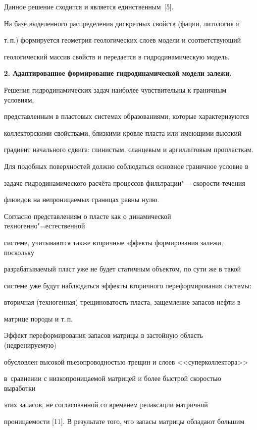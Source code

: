 Данное решение сходится и является единственным~[5].



На базе выделенного распределения дискретных свойств (фации, литология и

т.\,п.) формируется геометрия геологических слоев модели и соответствующий

геологический массив свойств и передается в гидродинамическую модель.



\textbf{2. Адаптированное формирование гидродинамической модели залежи.}

Решения гидродинамических задач наиболее чувствительны к граничным условиям,

представленным в пластовых системах образованиями, которые характеризуются

коллекторскими свойствами, близкими кровле пласта или имеющими высокий

градиент начального сдвига: глинистым, сланцевым и аргиллитовым пропласткам.

Для подобных поверхностей должно соблюдаться основное граничное условие в

задаче гидродинамического расчёта процессов фильтрации"--- скорости течения

флюидов на непроницаемых границах равны нулю.



Согласно представлениям о пласте как о динамической техногенно"=естественной

системе, учитываются также вторичные эффекты формирования залежи, поскольку

разрабатываемый пласт уже не будет статичным объектом, по сути же в такой

системе уже будут наблюдаться эффекты вторичного переформирования системы:

вторичная (техногенная) трещиноватость пласта, защемление запасов нефти в

матрице породы и т.\,п.



Эффект переформирования запасов матрицы в застойную область (недренируемую)

обусловлен высокой пьезопроводностью трещин и слоев <<суперколлектора>>

в~сравнении с низкопроницаемой матрицей и более быстрой скоростью выработки

этих запасов, не согласованной со временем релаксации матричной

проницаемости [11]. В результате того, что запасы матрицы обладают большим


